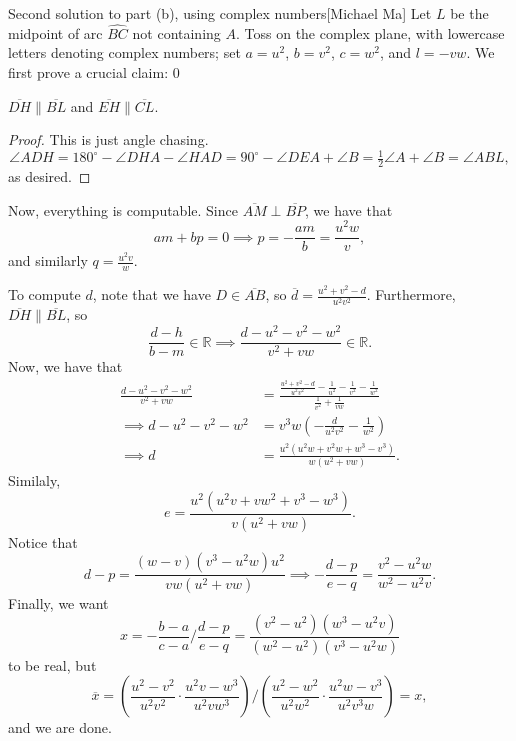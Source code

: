 \begin{customenv}{Second solution to part (b), using complex numbers}[Michael Ma]
    Let $L$ be the midpoint of arc $\widehat{BC}$ not containing $A$. Toss on the complex plane, with lowercase letters denoting complex numbers; set $a=u^2$, $b=v^2$, $c=w^2$, and $l=-vw$. We first prove a crucial claim:
    \setcounter{iclaim}0
    \begin{iclaim}
        $\overline{DH}\parallel\overline{BL}$ and $\overline{EH}\parallel\overline{CL}$.
    \end{iclaim}
    \begin{proof}
        This is just angle chasing. \[\angle ADH=180^\circ-\angle DHA-\angle HAD=90^\circ-\angle DEA+\angle B=\tfrac12\angle A+\angle B=\angle ABL,\]
        as desired.
    \end{proof}

    Now, everything is computable. Since $\overline{AM}\perp\overline{BP}$, we have that \[am+bp=0\implies p=-\frac{am}b=\frac{u^2w}v,\]
    and similarly $q=\tfrac{u^2v}w$.

    To compute $d$, note that we have $D\in\overline{AB}$, so $\overline d=\tfrac{u^2+v^2-d}{u^2v^2}$. Furthermore, $\overline{DH}\parallel\overline{BL}$, so \[\frac{d-h}{b-m}\in\mathbb R\implies\frac{d-u^2-v^2-w^2}{v^2+vw}\in\mathbb R.\]
    Now, we have that
    \begin{align*}
        \frac{d-u^2-v^2-w^2}{v^2+vw}&=\frac{\frac{u^2+v^2-d}{u^2v^2}-\frac1{u^2}-\frac1{v^2}-\frac1{w^2}}{\frac1{v^2}+\frac1{vw}}\\
        \implies d-u^2-v^2-w^2&=v^3w\left(-\frac d{u^2v^2}-\frac1{w^2}\right)\\
        \implies d&=\frac{u^2\left(u^2w+v^2w+w^3-v^3\right)}{w\left(u^2+vw\right)}.
    \end{align*}
    Similaly, \[e=\frac{u^2\left(u^2v+vw^2+v^3-w^3\right)}{v\left(u^2+vw\right)}.\]
    Notice that \[d-p=\frac{(w-v)\left(v^3-u^2w\right)u^2}{vw\left(u^2+vw\right)}\implies-\frac{d-p}{e-q}=\frac{v^2-u^2w}{w^2-u^2v}.\]
    Finally, we want \[x=-\frac{b-a}{c-a}\bigg/\frac{d-p}{e-q}=\frac{\left(v^2-u^2\right)\left(w^3-u^2v\right)}{\left(w^2-u^2\right)\left(v^3-u^2w\right)}\]
    to be real, but \[\overline x=\left(\frac{u^2-v^2}{u^2v^2}\cdot\frac{u^2v-w^3}{u^2vw^3}\right)\bigg/\left(\frac{u^2-w^2}{u^2w^2}\cdot\frac{u^2w-v^3}{u^2v^3w}\right)=x,\]
    and we are done. 
\end{customenv}
